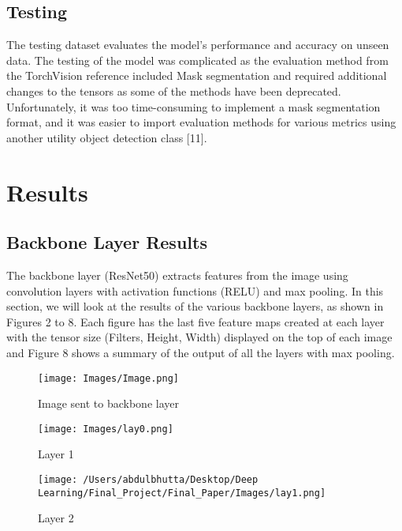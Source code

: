 \documentclass[conference]{IEEEtran}
\begin{document}
\subsection{Testing}
The testing dataset evaluates the model's performance and accuracy on unseen data. The testing of the model was complicated as the evaluation method from the TorchVision 
reference included Mask segmentation and required additional changes to the tensors as some of the methods have been deprecated. Unfortunately, it was too time-consuming to 
implement a mask segmentation format, and it was easier to import evaluation methods for various metrics using another utility object detection class [11].

\section{Results}

    \subsection{Backbone Layer Results}
    The backbone layer (ResNet50) extracts features from the image using convolution layers with activation functions (RELU) and max pooling. 
    In this section, we will look at the results of the various backbone layers, as shown in Figures 2 to 8. Each figure has the last five 
    feature maps created at each layer with the tensor size (Filters, Height, Width) displayed on the top of each image and Figure 8 shows a summary of the output
    of all the layers with max pooling. 
        \begin{figure} [!htbp]
                \centering
                \texttt{[image: Images/Image.png]}
                \caption{Image sent to backbone layer}
                \label{fig:my_label}
            \end{figure}

            \begin{figure}
                \centering
                \texttt{[image: Images/lay0.png]}
                \caption{Layer 1}
                \label{fig:my_label}
            \end{figure}

            \begin{figure}
                \centering
                \texttt{[image: /Users/abdulbhutta/Desktop/Deep Learning/Final\_Project/Final\_Paper/Images/lay1.png]}
                \caption{Layer 2}
                \label{fig:my_label}
            \end{figure}
\end{document}
